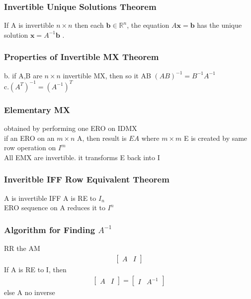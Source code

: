 \documentclass[12pt]{article}
\newcommand{\R}{\mathbb{R}}
\begin{document}
    \subsubsection{Invertible Unique Solutions Theorem}
        If A is invertible $ n \times n $  then each $ \bm{b}\in\R^n $,
        the equation $ A\bm{x} = \bm{b} $  has the unique solution
        $ \bm{x} = A^{-1}\bm{b} $ .
    \subsubsection{Properties of Invertible MX Theorem}
        b. if A,B are $ n \times n $  invertible MX, then so it AB
        $ (AB)^{-1} = B^{-1}A^{-1} $ \\
        c.$ (A^{T})^{-1} = (A^{-1})^{T} $ 
    \subsubsection{Elementary MX}
        obtained by performing one ERO on IDMX \\
        if an ERO on an $ m \times n $  A, then result is
        $ EA $  where $ m \times m  $  E is created by
        same row operation on $ I^{m} $  \\
        All EMX are invertible. it transforms E back into I
    \subsubsection{Inveritble IFF Row Equivalent Theorem}
        A is invertible IFF A is RE to $ I_{n} $  \\
        ERO sequence on A reduces it to $ I^{n} $ 
    \subsubsection{Algorithm for Finding $ A^{-1} $}
        RR the AM
        \begin{align*}
            \begin{bmatrix}
                A & I
            \end{bmatrix}
        \end{align*} 
        If A is RE to I, then 
         \begin{align*}
            \begin{bmatrix}
                A & I
            \end{bmatrix}
            = 
            \begin{bmatrix}
                I & A^{-1}
            \end{bmatrix}
        \end{align*} 
        else A no inverse
        
\end{document}
